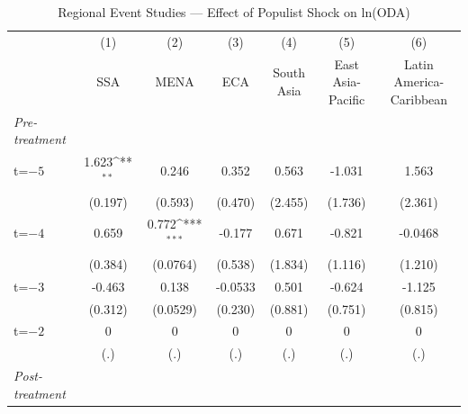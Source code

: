 \begin{table}[htbp]\centering
\def\sym#1{\ifmmode^{#1}\else\(^{#1}\)\fi}
\caption{Regional Event Studies — Effect of Populist Shock on ln(ODA)}
\begin{tabular}{l*{6}{c}}
\toprule
            &\multicolumn{1}{c}{(1)}&\multicolumn{1}{c}{(2)}&\multicolumn{1}{c}{(3)}&\multicolumn{1}{c}{(4)}&\multicolumn{1}{c}{(5)}&\multicolumn{1}{c}{(6)}\\
            &\multicolumn{1}{c}{SSA}&\multicolumn{1}{c}{MENA}&\multicolumn{1}{c}{ECA}&\multicolumn{1}{c}{South Asia}&\multicolumn{1}{c}{East Asia-Pacific}&\multicolumn{1}{c}{Latin America-Caribbean}\\
\midrule
\textit{Pre-treatment}&                     &                     &                     &                     &                     &                     \\
\addlinespace
t=$-5$      &       1.623\sym{**} &       0.246         &       0.352         &       0.563         &      -1.031         &       1.563         \\
            &     (0.197)         &     (0.593)         &     (0.470)         &     (2.455)         &     (1.736)         &     (2.361)         \\
\addlinespace
t=$-4$      &       0.659         &       0.772\sym{***}&      -0.177         &       0.671         &      -0.821         &     -0.0468         \\
            &     (0.384)         &    (0.0764)         &     (0.538)         &     (1.834)         &     (1.116)         &     (1.210)         \\
\addlinespace
t=$-3$      &      -0.463         &       0.138         &     -0.0533         &       0.501         &      -0.624         &      -1.125         \\
            &     (0.312)         &    (0.0529)         &     (0.230)         &     (0.881)         &     (0.751)         &     (0.815)         \\
\addlinespace
t=$-2$      &           0         &           0         &           0         &           0         &           0         &           0         \\
            &         (.)         &         (.)         &         (.)         &         (.)         &         (.)         &         (.)         \\
\addlinespace
\textit{Post-treatment}&                     &                     &                     &                     &                     &                     \\

\end{tabular}
\end{table}
